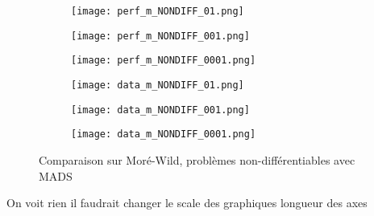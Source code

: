 \documentclass[letterpaper]{scrartcl}
\begin{document}
\begin{figure}[!htb] %
	\begin{subfigure}{0.48\textwidth}
		\texttt{[image: perf\_m\_NONDIFF\_01.png]}
	\end{subfigure}\hspace*{\fill}
	\begin{subfigure}{0.48\textwidth}
		\texttt{[image: perf\_m\_NONDIFF\_001.png]}
	\end{subfigure}
	\medskip
	\begin{subfigure}{0.48\textwidth}
		\texttt{[image: perf\_m\_NONDIFF\_0001.png]}
	\end{subfigure}\hspace*{\fill}
	\begin{subfigure}{0.48\textwidth}
		\texttt{[image: data\_m\_NONDIFF\_01.png]}
	\end{subfigure}
	\medskip
	\begin{subfigure}{0.48\textwidth}
		\texttt{[image: data\_m\_NONDIFF\_001.png]}
	\end{subfigure}\hspace*{\fill}
	\begin{subfigure}{0.48\textwidth}
		\texttt{[image: data\_m\_NONDIFF\_0001.png]}
	\end{subfigure}
	\caption{Comparaison sur Moré-Wild, problèmes non-différentiables avec MADS} \label{fig:10}
\end{figure}
\clearpage
On voit rien il faudrait changer le scale des graphiques longueur des axes 
\clearpage
\end{document}
